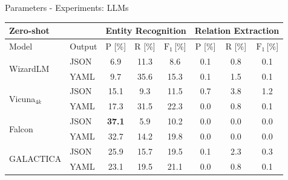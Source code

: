 \documentclass[en,16:9,smallfoot]{sdqbeamer}
\begin{document}
   \begin{frame}{Parameters - Experiments: LLMs}
    \begin{table}
     \begin{small}
      \centering
      \begin{tabular}{ll|ccc|ccc}
        \hline
        \multicolumn{2}{l|}{\textbf{Zero-shot}} &
        \multicolumn{3}{c|}{Entity Recognition} &
        \multicolumn{3}{c}{Relation Extraction} \\
        \hline
        Model & Output & P [\%] & R [\%] & $\text{F}_1$\,[\%] &
                         P [\%] & R [\%] & $\text{F}_1$\,[\%] \\
        \hline

        \multirow{2}{*}{WizardLM} &
        JSON & 6.9 & 11.3 & 8.6
                  & 0.1 & 0.8 & 0.1 \\
        \ & YAML & 9.7 & 35.6 &
        \hphantom{${}_{\Delta\text{+6.7}}$}
        15.3{\color{parametergreen}{${}_{\Delta\text{+6.7}}$}}
                  & 0.1 & 1.5 &
        \hphantom{${}_{\Delta\text{+0.0}}$}
        0.1{\color{contextgrey}{${}_{\Delta\text{+0.0}}$}}  \\
        \cline{1-2}

        \multirow{2}{*}{Vicuna${}_{4k}$} &
        JSON & 15.1 & 9.3 & 11.5
                  & 0.7 & 3.8 & 1.2 \\
        \ & YAML & 17.3 & 31.5 &
        \hphantom{${}_{\Delta\text{+10.8}}$}
        22.3{\color{parametergreen}{${}_{\Delta\text{+10.8}}$}}
                  & 0.0 & 0.8 &
        \hphantom{${}_{\Delta\text{-1.1}}$}
        0.1{\color{valuered}{${}_{\Delta\text{-1.1}}$}}  \\
        \cline{1-2}

        \multirow{2}{*}{Falcon} &
        JSON & \textbf{37.1} & 5.9 & 10.2
                  & 0.0 & 0.0 & 0.0 \\
        \ & YAML & 32.7 & 14.2 &
        \hphantom{${}_{\Delta\text{+9.6}}$}
        19.8{\color{parametergreen}{${}_{\Delta\text{+9.6}}$}}
                  & 0.0 & 0.0 &
        \hphantom{${}_{\Delta\text{+0.0}}$}
        0.0{\color{contextgrey}{${}_{\Delta\text{+0.0}}$}}  \\
        \cline{1-2}

        \multirow{2}{*}{GALACTICA} &
        JSON & 25.9 & 15.7 & 19.5
                  & 0.1 & 2.3 & 0.3 \\
        \ & YAML & 23.1 & 19.5 &
        \hphantom{${}_{\Delta\text{+1.6}}$}
        21.1{\color{parametergreen}{${}_{\Delta\text{+1.6}}$}}
                  & 0.0 & 0.8 &
        \hphantom{${}_{\Delta\text{-0.2}}$}
        0.1{\color{valuered}{${}_{\Delta\text{-0.2}}$}}  \\
        \cline{1-2}


\end{tabular}
\end{small}
\end{table}
\end{frame}
\end{document}
